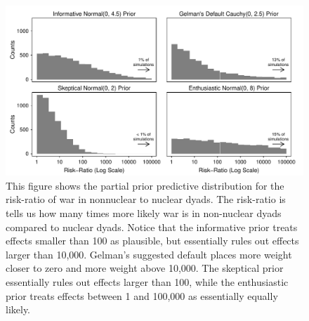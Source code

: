 \documentclass[12pt]{article}
\begin{document}
\begin{figure}[H]
\begin{center}
\includegraphics[scale = .8]{figs/bm-pppd-hist.pdf}
\caption{This figure shows the partial prior predictive distribution for the risk-ratio of war in nonnuclear to nuclear dyads. The risk-ratio is tells us how many times more likely war is in non-nuclear dyads compared to nuclear dyads. Notice that the informative prior treats effects smaller than 100 as plausible, but essentially rules out effects larger than 10,000. Gelman's suggested default places more weight closer to zero and more weight above 10,000. The skeptical prior essentially rules out effects larger than 100, while the enthusiastic prior treats effects between 1 and 100,000 as essentially equally likely.}\label{fig:bm-pppd-hist}
\end{center}
\end{figure}
\end{document}
